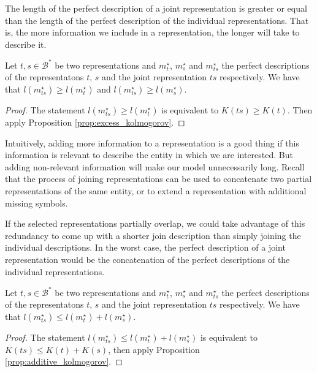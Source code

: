 The length of the perfect description of a joint representation is greater or equal than the length of the perfect description of the individual representations. That is, the more information we include in a representation, the longer will take to describe it. 

\begin{proposition}
\label{prop:joint_length}
Let $t,s \in \mathcal{B}^\ast$ be two representations and $m_{t}^{\star}$, $m_{s}^{\star}$ and $m_{ts}^{\star}$ the perfect descriptions of the representatons $t$, $s$ and the joint representation $ts$ respectively. We have that $l \left( m_{ts}^{\star} \right) \geq l \left( m_{t}^{\star} \right)$ and $l \left( m_{ts}^{\star} \right) \geq l \left( m_{s}^{\star} \right)$.
\end{proposition}
\begin{proof}
The statement $l \left( m_{ts}^{\star} \right) \geq l \left( m_{t}^{\star} \right)$ is equivalent to $K(ts) \geq K(t)$. Then apply Proposition \ref{prop:excess_kolmogorov}.
\end{proof}

Intuitively, adding more information to a representation is a good thing if this information is relevant to describe the entity in which we are interested. But adding non-relevant information will make our model unnecessarily long. Recall that the process of joining representations can be used to concatenate two partial representations of the same entity, or to extend a representation with additional missing symbols.

If the selected representations partially overlap, we could take advantage of this redundancy to come up with a shorter join description than simply joining the individual descriptions. In the worst case, the perfect description of a joint representation would be the concatenation of the perfect descriptions of the individual representations.

\begin{proposition}
\label{prop:joint_sum}
Let $t,s \in \mathcal{B}^\ast$ be two representations and $m_{t}^{\star}$, $m_{s}^{\star}$ and $m_{ts}^{\star}$ the perfect descriptions of the representatons $t$, $s$ and the joint representation $ts$ respectively. We have that $l \left( m_{ts}^{\star} \right) \leq l \left( m_{t}^{\star} \right) + l \left( m_{s}^{\star} \right)$.
\end{proposition}
\begin{proof}
The statement $l \left( m_{ts}^{\star} \right) \leq l \left( m_{t}^{\star} \right) + l \left( m_{s}^{\star} \right)$ is equivalent to $K(ts) \leq K(t) + K(s)$, then apply Proposition \ref{prop:additive_kolmogorov}.
\end{proof}

